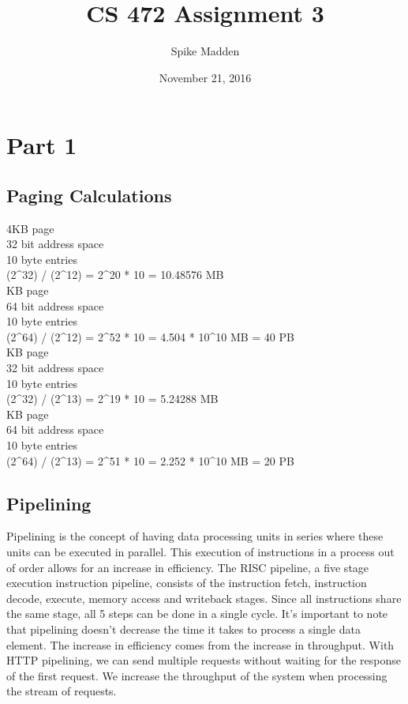 \documentclass[letterpaper,10pt,titlepage]{article}
\title{CS 472 Assignment 3}
\author{Spike Madden}
\date{November 21, 2016}
\begin{document}
\maketitle
\pagebreak

\section*{Part 1}

\subsection*{Paging Calculations}

4KB page \\
32 bit address space \\
10 byte entries \\

(2\^{}32) / (2\^{}12) = 2\^{}20 * 10 = 10.48576 MB \\

 KB page \\
64 bit address space \\
10 byte entries \\

(2\^{}64) / (2\^{}12) = 2\^{}52 * 10 = 4.504 * 10\^{}10 MB = 40 PB \\

 KB page \\
32 bit address space \\
10 byte entries \\

(2\^{}32) / (2\^{}13) = 2\^{}19 * 10 = 5.24288 MB \\

 KB page \\
64 bit address space \\
10 byte entries \\

(2\^{}64) / (2\^{}13) = 2\^{}51 * 10 = 2.252 * 10\^{}10 MB = 20 PB \\

\subsection*{Pipelining}

Pipelining is the concept of having data processing units in series where these units can be executed in parallel. This execution of instructions in a process out of order allows for an increase in efficiency. The RISC pipeline, a five stage execution instruction pipeline, consists of the instruction fetch, instruction decode, execute, memory access and writeback stages. Since all instructions share the same stage,  all 5 steps can be done in a single cycle. It's important to note that pipelining doesn't decrease the time it takes to process a single data element. The increase in efficiency comes from the increase in throughput. With HTTP pipelining, we can send multiple requests without waiting for the response of the first request. We increase the throughput of the system when processing the stream of requests.
\end{document}

